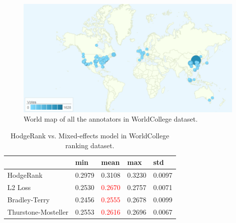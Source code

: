 \documentclass[10pt,journal,cspaper,compsoc]{IEEEtran}
\begin{document}
{\begin{figure}[h]
 \begin{center}
\includegraphics[width=0.55\linewidth]{map.png}
  \caption{World map of all the annotators in WorldCollege dataset.} \label{map}
\end{center}
\end{figure}

\begin{table}[h]\caption{\label{tab:university} HodgeRank vs. Mixed-effects model in WorldCollege ranking dataset.}
\centering
\begin{tabular}{lllll}
 \hline     &min  &mean &max &std\\
 \hline  HodgeRank     &0.2979    &0.3108    &0.3230    &0.0097  \\
\hline  L2 Loss      &0.2530    &\textcolor{red}{0.2670}    &0.2757    &0.0071  \\
\hline Bradley-Terry     &0.2456    &\textcolor{red}{0.2555}    &0.2678    &0.0099 \\
\hline Thurstone-Mosteller      &0.2553    &\textcolor{red}{0.2616}    &0.2696    &0.0067  \\
 \hline
 \end {tabular}
\end{table}




}
\end{document}
